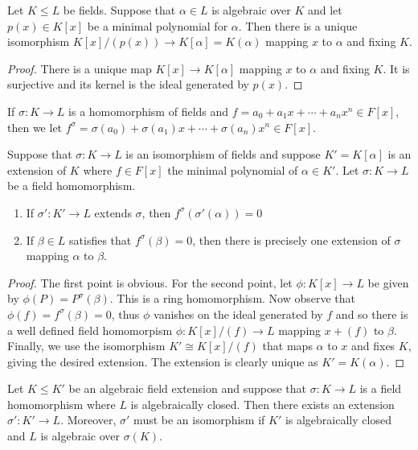 \documentclass[twoside, a4paper, 10pt]{amsart}
\begin{document}
\begin{prop} Let $K \leq L$ be fields. Suppose that $\alpha \in L$ is algebraic over $K$ and let $p(x) \in K[x]$ be a minimal polynomial for $\alpha$. Then there is a unique isomorphism $K[x]/(p(x)) \to K[\alpha] = K(\alpha)$ mapping $x$ to $\alpha$ and fixing $K$. \end{prop}

\begin{proof} There is a unique map $K[x] \to K[\alpha]$ mapping $x$ to $\alpha$ and fixing $K$. It is surjective and its kernel is the ideal generated by $p(x)$. \end{proof}

If $\sigma: K \to L$ is a homomorphism of fields and $f = a_0 + a_1x + \cdots + a_nx^n \in F[x]$, then we let $f^{\sigma} = \sigma(a_0) + \sigma(a_1) x + \cdots + \sigma(a_n)x^n \in F[x]$.

\begin{lemma} Suppose that $\sigma: K \to L$ is an isomorphism of fields and suppose $K' = K[\alpha]$ is an extension of $K$ where $f \in F[x]$ the minimal polynomial of $\alpha \in K'$. Let $\sigma:K \to L$ be a field homomorphism.

\begin{enumerate}
	\item If $\sigma': K' \to L$ extends $\sigma$, then $f^{\sigma}(\sigma'(\alpha)) = 0$
	\item If $\beta \in L$ satisfies that $f^{\sigma}(\beta) = 0$, then there is precisely one extension of $\sigma$ mapping $\alpha$ to $\beta$.
\end{enumerate}
\end{lemma}

\begin{proof} The first point is obvious. For the second point, let $\phi:K[x] \to L$ be given by $\phi(P) = P^{\sigma}(\beta)$. This is a ring homomorphism. Now observe that $\phi(f) = f^{\sigma}(\beta) = 0$, thus $\phi$ vanishes on the ideal generated by $f$ and so there is a well defined field homomorpism $\phi:K[x]/(f) \to L$ mapping $x + (f)$ to $\beta$. Finally, we use the isomorphism $ K' \cong K[x]/(f)$ that maps $\alpha$ to $x$ and fixes $K$, giving the desired extension. The extension is clearly unique as $K' = K(\alpha)$.

\end{proof}

\begin{prop} \label{prop: extend morphism to K'} Let $K \leq K'$ be an algebraic field extension and suppose that $\sigma:K \to L$ is a field homomorphism where $L$ is algebraically closed. Then there exists an extension $\sigma':K' \to L$. Moreover, $\sigma'$ must be an isomorphism if $K'$ is algebraically closed and $L$ is algebraic over $\sigma(K)$.

\end{prop}
\end{document}
